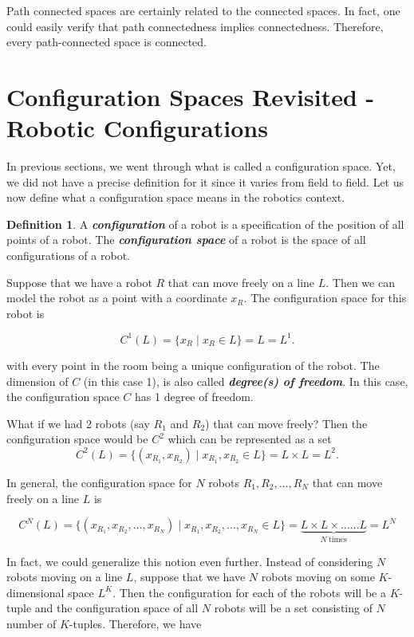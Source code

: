 \documentclass[12pt]{article}
\theoremstyle{definition}
\newtheorem*{definition}{Definition}
\begin{document}
Path connected spaces are certainly related to the connected spaces.
In fact, one could easily verify that path connectedness implies connectedness.
Therefore, every path-connected space is connected.


\section*{\centering Configuration Spaces Revisited - Robotic Configurations}
In previous sections, we went through what is called a configuration space.
Yet, we did not have a precise definition for it since it varies from field to field.
Let us now define what a configuration space means in the robotics context.

\begin{definition}
\cite{10} A \textit{\textbf{configuration}} of a robot is a specification of the position of all points of a robot.
The \textit{\textbf{configuration space}} of a robot is the space of all configurations of a robot.
\end{definition}

Suppose that we have a robot $R$ that can move freely on a line $L$. Then we can model the robot as
a point with a coordinate $x_R$. The configuration space for this robot is

$$C^1(L) = \{x_R \mid x_R \in L\} = L = L^1.$$

with every point in the room being a unique configuration of the robot.
The dimension of $C$ (in this case 1), is also called \textit{\textbf{degree(s) of freedom}}.
In this case, the configuration space $C$ has 1 degree of freedom.

\bigskip

What if we had 2 robots (say $R_1$ and $R_2$) that can move freely?
Then the configuration space would be $C^2$ which can be represented as a set
$$C^2(L) = \{(x_{R_1}, x_{R_2}) \mid x_{R_1}, x_{R_2} \in L\} = L \times L = L^2.$$

In general, the configuration space for $N$ robots $R_1, R_2, \dots, R_N$ that can move freely on a line $L$ is

$$C^N(L) = \{(x_{R_1}, x_{R_2}, \dots, x_{R_N}) \mid x_{R_1}, x_{R_2}, \dots, x_{R_N} \in L\} = \underbrace{L \times L \times \dots \dots L}_{N \ \text{times}} = L^N$$

In fact, we could generalize this notion even further. Instead of considering
$N$ robots moving on a line $L$, suppose that we have $N$ robots moving on some
$K$-dimensional space $L^K$. Then the configuration for each of the robots will
be a $K$-tuple and the configuration space of all $N$ robots will be a set consisting
of $N$ number of $K$-tuples. Therefore, we have
\end{document}
